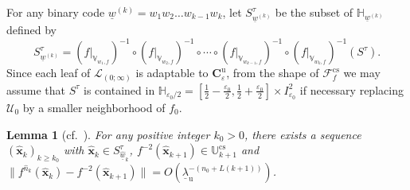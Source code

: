 \documentclass{amsart}
\theoremstyle{plain}
\newtheorem{lem}[thm]{Lemma}
\theoremstyle{definition}
\numberwithin{equation}{section}
\numberwithin{figure}{section}
\def\hh{\mathbb{H}}
\def\ve{\varepsilon}
\def\cs{{\mathrm{cs}}}
\def\ru{{\mathrm{u}}}
\def\cf{{\mathcal{F}}}
\begin{document}
For any binary code $\underline{w}^{(k)}=w_1w_2\ldots w_{k-1}w_k$,
let $S_{\underline{w}^{(k)}}^{\tau}$ be the subset  of $\hh_{\underline{w}^{(k)}}$ defined by 
\[
S_{\underline{w}^{(k)}}^\tau=(f|_{\mathbb{V}_{w_1,f}})^{-1}\circ (f|_{\mathbb{V}_{w_2,f}})^{-1}\circ\cdots \circ (f|_{\mathbb{V}_{w_{k-1},f}})^{-1}\circ (f|_{\mathbb{V}_{w_k,f}})^{-1}(S^\tau).
\]
Since each leaf of $\mathcal{L}_{(0;\infty)}$ is adaptable to $\boldsymbol{C}_{\ve}^{\ru}$, 
from the shape of $\cf_f^{\cs}$ we may assume that $S^\tau$ is contained in $\hh_{\ve_0/2}=
[\frac12-\frac{\ve_0}2,\frac12+\frac{\ve_0}2]\times I_{\ve_0}^2$ 
if necessary replacing $\mathcal{U}_0$ by a smaller neighborhood of $f_0$.





\begin{lem}[cf.\ {\cite[Lemma 8.3]{KNS}}]\label{l_xkinS}
For any positive integer $k_0>0$, there exists a sequence $(\widehat{\boldsymbol{x}}_k)_{k\geq k_0}$ with $\widehat{\boldsymbol{x}}_k\in S_{\widehat{\underline{w}}_k}^\tau$,  
$f^{-2}(\widehat{\boldsymbol{x}}_{k+1})\in \mathbb{U}_{k+1}^{\mathrm{cs}}$ and 
$\|f^{\widehat n_k}(\widehat{\boldsymbol{x}}_k)- f^{-2}(\widehat{\boldsymbol{x}}_{k+1})\|=O(\underline{\lambda}_{\mathrm{u}}^{-(n_0+L(k+1))})$.
\end{lem}
\end{document}

